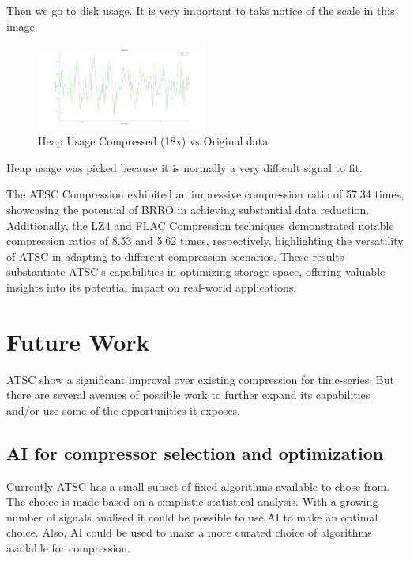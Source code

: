 \documentclass[conference]{IEEEtran}
\begin{document}
Then we go to disk usage. It is very important to take notice of the scale in this image.

  \begin{figure}[h]
    \centering
    \includegraphics[width=0.5\textwidth]{heap-usage-validation.png}
    \caption{Heap Usage Compressed (18x) vs Original data}
    \label{heap}
  \end{figure}
\vspace{10pt}

Heap usage was picked because it is normally a very difficult signal to fit.

The ATSC Compression exhibited an impressive compression ratio of 57.34 times, showcasing the potential of BRRO in achieving substantial data reduction. Additionally, the LZ4 and FLAC Compression techniques demonstrated notable compression ratios of 8.53 and 5.62 times, respectively, highlighting the versatility of ATSC in adapting to different compression scenarios. 
These results substantiate ATSC's capabilities in optimizing storage space, offering valuable insights into its potential impact on real-world applications. 

\section{Future Work}

ATSC show a significant improval over existing compression for time-series. But there are several avenues of possible work to further expand its capabilities and/or use some of the opportunities it exposes.


\subsection{AI for compressor selection and optimization}

Currently ATSC has a small subset of fixed algorithms available to chose from. The choice is made based on a simplistic statistical analysis. With a growing number of signals analised it could be possible to use AI to make an optimal choice. 
Also, AI could be used to make a more curated choice of algorithms available for compression.
\end{document}
